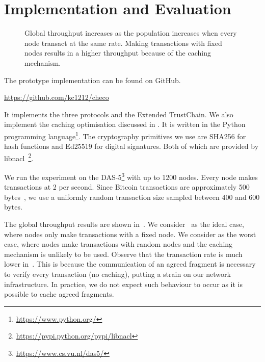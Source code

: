 \section{Implementation and Evaluation}
\label{sec:implementation}

\begin{figure*}[t]
  \centering
  \caption{Global throughput increases as the population increases when every node transact at the same rate.
  Making transactions with fixed nodes results in a higher throughput because of the caching mechanism.}
  \label{fig:global-throughput}
\end{figure*}

The prototype implementation can be found on GitHub.
\begin{displayquote}
\url{https://github.com/kc1212/checo}
\end{displayquote}
It implements the three protocols and the Extended TrustChain.
We also implement the caching optimisation discussed in .
It is written in the Python programming language\footnote{\url{https://www.python.org/}}.
The cryptography primitives we use are SHA256 for hash functions and Ed25519 for digital signatures.
Both of which are provided by libnacl~\footnote{\url{https://pypi.python.org/pypi/libnacl}}.

We run the experiment on the DAS-5\footnote{\url{https://www.cs.vu.nl/das5/}} with up to 1200 nodes.
Every node makes transactions at 2 per second.
Since Bitcoin transactions are approximately 500 bytes~\cite{txsize},
we use a uniformly random transaction size sampled between 400 and 600 bytes.

The global throughput results are shown in~.
We consider~ as the ideal case,
where nodes only make transactions with a fixed node.
We consider  as the worst case,
where nodes make transactions with random nodes and the caching mechanism is unlikely to be used.
Observe that the transaction rate is much lower in~.
This is because the communication of an agreed fragment is necessary to verify every transaction (no caching),
putting a strain on our network infrastructure.
In practice, we do not expect such behaviour to occur as it is possible to cache agreed fragments.

